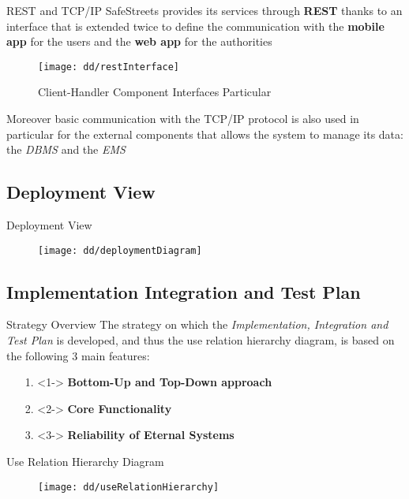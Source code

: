 		\begin{frame}{REST and TCP/IP}
			SafeStreets provides its services through \textbf{REST} thanks to an interface that is extended twice to define the communication with the \textbf{mobile app} for the users and the \textbf{web app} for the authorities
			
			\begin{figure}
				\begin{minipage}{0.42\textwidth}
					\centering
					\texttt{[image: dd/restInterface]}
				\end{minipage}
				\begin{minipage}{0.3\textwidth}\tiny
					\color{polimiblue}Client-Handler Component Interfaces Particular
				\end{minipage}
			\end{figure}
			
			Moreover basic communication with the TCP/IP protocol is also used in particular for the external components that allows the system to manage its data: the \emph{DBMS} and the \emph{EMS}
		\end{frame}
		
	\subsection{Deployment View}
		\begin{frame}{Deployment View}
			\begin{figure}[hbtp]
				\vspace{-10pt}
				\centering
				\texttt{[image: dd/deploymentDiagram]}
			\end{figure}
		\end{frame}
	
	\subsection{Implementation Integration and Test Plan}
		\begin{frame}{Strategy Overview}
			\vspace{-2cm}
			The strategy on which the \emph{Implementation, Integration and Test Plan} is developed, and thus the use relation hierarchy diagram, is based on the following 3 main features:
			
			\vspace{1cm}
			\begin{itemize}
				\item[1.] <1-> \textbf{Bottom-Up and Top-Down approach}
				\item[2.] <2-> \textbf{Core Functionality}
				\item[3.] <3-> \textbf{Reliability of Eternal Systems}
			\end{itemize}
		\end{frame}
	
		\begin{frame}{Use Relation Hierarchy Diagram}
			\begin{figure}
				\vspace{-10pt}
				\centering
				\texttt{[image: dd/useRelationHierarchy]}
			\end{figure}
		\end{frame}